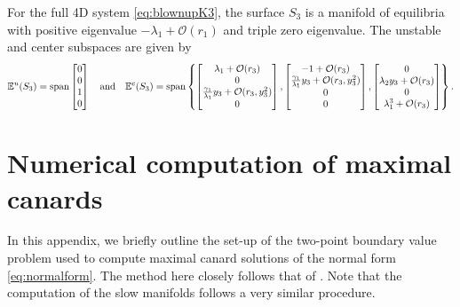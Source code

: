 \documentclass[10pt,onecolumn]{article}
\theoremstyle{plain}
\begin{document}
For the full 4D system \eqref{eq:blownupK3}, the surface $S_3$ is a manifold of equilibria with positive eigenvalue $-\lambda_1 + \mathcal O(r_1)$ and triple zero eigenvalue. The unstable and center subspaces are given by  
%
\[ \mathbb E^u(S_3) = {\rm span}\begin{bmatrix} 0\\0\\1\\0 \end{bmatrix} \quad {\rm and } \quad \mathbb E^c (S_3) = {\rm span} \left\{ \begin{bmatrix} \lambda_1+\mathcal O(r_3) \\ 0 \\ \tfrac{\gamma_1}{\lambda_1} y_3 + \mathcal O(r_3,y_3^2) \\ 0 \end{bmatrix}, \begin{bmatrix} -1+\mathcal O(r_3) \\ \tfrac{\gamma_1}{\lambda_1} y_3 + \mathcal O(r_3,y_3^2) \\ 0 \\ 0 \end{bmatrix}, \begin{bmatrix} 0 \\ \lambda_2 y_3 + \mathcal O(r_3) \\ 0 \\ \lambda_1^3 + \mathcal O(r_3) \end{bmatrix}\right\}. \]
%



\section{Numerical computation of maximal canards}  \label{appendix:bvp}
In this appendix, we briefly outline the set-up of the two-point boundary value problem used to compute maximal canard solutions of the normal form \eqref{eq:normalform}. The method here closely follows that of \cite{Hasan2017}. Note that the computation of the slow manifolds follows a very similar procedure.
\end{document}
